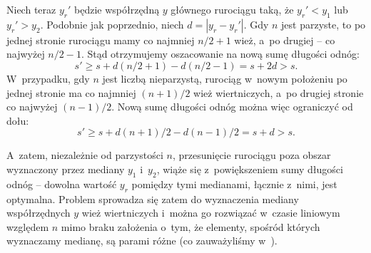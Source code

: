 Niech teraz $y_r'$ będzie współrzędną $y$ głównego rurociągu taką, że $y_r'<y_1$ lub $y_r'>y_2$.
Podobnie jak poprzednio, niech $d=|y_r-y_r'|$.
Gdy $n$ jest parzyste, to po jednej stronie rurociągu mamy co najmniej $n/2+1$ wież, a~po drugiej -- co najwyżej $n/2-1$.
Stąd otrzymujemy oszacowanie na nową sumę długości odnóg:
\[
    s' \ge s+d(n/2+1)-d(n/2-1) = s+2d > s.
\]
W~przypadku, gdy $n$ jest liczbą nieparzystą, rurociąg w~nowym położeniu po jednej stronie ma co najmniej $(n+1)/2$ wież wiertniczych, a~po drugiej stronie co najwyżej $(n-1)/2$.
Nową sumę długości odnóg można więc ograniczyć od dołu:
\[
    s' \ge s+d(n+1)/2-d(n-1)/2 = s+d > s.
\]

A~zatem, niezależnie od parzystości $n$, przesunięcie rurociągu poza obszar wyznaczony przez mediany $y_1$ i~$y_2$, wiąże się z~powiększeniem sumy długości odnóg  -- dowolna wartość $y_r$ pomiędzy tymi medianami, łącznie z~nimi, jest optymalna.
Problem sprowadza się zatem do wyznaczenia mediany współrzędnych $y$ wież wiertniczych i~można go rozwiązać w~czasie liniowym względem $n$ mimo braku założenia o~tym, że elementy, spośród których wyznaczamy medianę, są parami różne (co zauważyliśmy w~).
